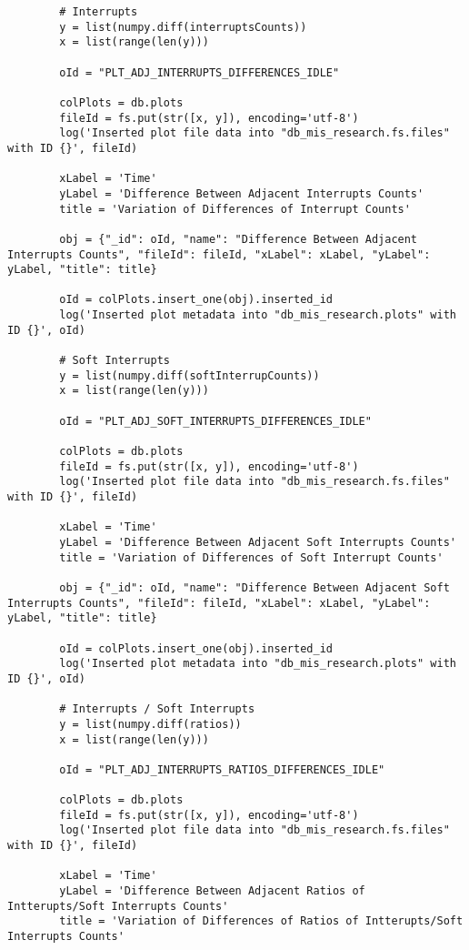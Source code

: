 \begin{code}
\begin{verbatim}
    	# Interrupts
    	y = list(numpy.diff(interruptsCounts))
    	x = list(range(len(y)))
    
    	oId = "PLT_ADJ_INTERRUPTS_DIFFERENCES_IDLE"
    
    	colPlots = db.plots
    	fileId = fs.put(str([x, y]), encoding='utf-8')
    	log('Inserted plot file data into "db_mis_research.fs.files" with ID {}', fileId)
    
    	xLabel = 'Time'
    	yLabel = 'Difference Between Adjacent Interrupts Counts'
    	title = 'Variation of Differences of Interrupt Counts'
    
    	obj = {"_id": oId, "name": "Difference Between Adjacent Interrupts Counts", "fileId": fileId, "xLabel": xLabel, "yLabel": yLabel, "title": title}
    
    	oId = colPlots.insert_one(obj).inserted_id
    	log('Inserted plot metadata into "db_mis_research.plots" with ID {}', oId)
    
    	# Soft Interrupts
    	y = list(numpy.diff(softInterrupCounts))
    	x = list(range(len(y)))
    
    	oId = "PLT_ADJ_SOFT_INTERRUPTS_DIFFERENCES_IDLE"
    
    	colPlots = db.plots
    	fileId = fs.put(str([x, y]), encoding='utf-8')
    	log('Inserted plot file data into "db_mis_research.fs.files" with ID {}', fileId)
    
    	xLabel = 'Time'
    	yLabel = 'Difference Between Adjacent Soft Interrupts Counts'
    	title = 'Variation of Differences of Soft Interrupt Counts'
    
    	obj = {"_id": oId, "name": "Difference Between Adjacent Soft Interrupts Counts", "fileId": fileId, "xLabel": xLabel, "yLabel": yLabel, "title": title}
    
    	oId = colPlots.insert_one(obj).inserted_id
    	log('Inserted plot metadata into "db_mis_research.plots" with ID {}', oId)
    
    	# Interrupts / Soft Interrupts
    	y = list(numpy.diff(ratios))
    	x = list(range(len(y)))
    
    	oId = "PLT_ADJ_INTERRUPTS_RATIOS_DIFFERENCES_IDLE"
    
    	colPlots = db.plots
    	fileId = fs.put(str([x, y]), encoding='utf-8')
    	log('Inserted plot file data into "db_mis_research.fs.files" with ID {}', fileId)
    
    	xLabel = 'Time'
    	yLabel = 'Difference Between Adjacent Ratios of Intterupts/Soft Interrupts Counts'
    	title = 'Variation of Differences of Ratios of Intterupts/Soft Interrupts Counts'
    

\end{verbatim}
\end{code}
